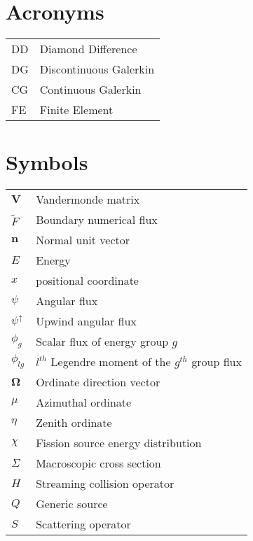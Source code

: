 
\section*{Acronyms}
\begin{tabular}{l l}
DD & Diamond Difference \\
DG & Discontinuous Galerkin \\
CG & Continuous Galerkin \\
FE & Finite Element
\end{tabular}

\section*{Symbols}
\begin{tabular}{l l}
$\mathbf V$ & Vandermonde matrix \\
$\tilde F$ & Boundary numerical flux \\
$\mathbf n$ & Normal unit vector \\
$E$ & Energy \\
$x$ & positional coordinate \\
$\psi$ & Angular flux \\
$\psi^{\uparrow}$ & Upwind angular flux \\
$\phi_g$ & Scalar flux of energy group $g$ \\
$\phi_{lg}$ & $l^{th}$ Legendre moment of the $g^{th}$ group flux \\
$\mathbf \Omega$ & Ordinate direction vector \\
$\mu$ & Azimuthal ordinate \\
$\eta$ & Zenith ordinate \\
$\chi$  & Fission source energy distribution \\
$\Sigma$ & Macroscopic cross section \\
$H$ & Streaming collision operator \\
$Q$ & Generic source \\
$S$ & Scattering operator \\
\end{tabular}

\pagebreak
